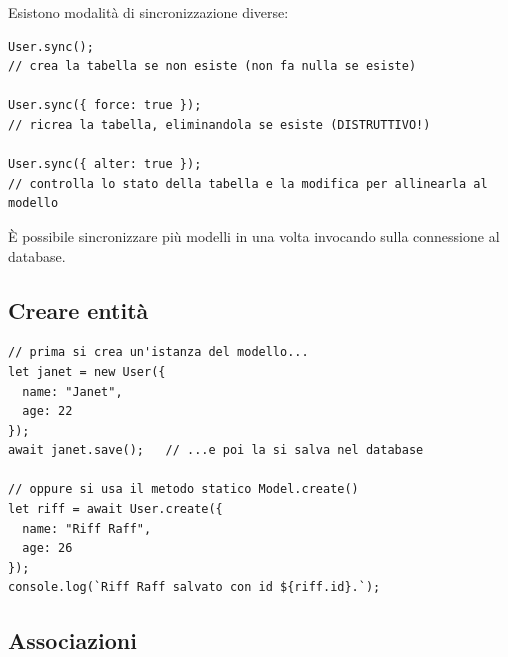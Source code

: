 Esistono modalità di sincronizzazione diverse:

\begin{lstlisting}[style=js]
User.sync();
// crea la tabella se non esiste (non fa nulla se esiste)

User.sync({ force: true });
// ricrea la tabella, eliminandola se esiste (DISTRUTTIVO!)

User.sync({ alter: true });
// controlla lo stato della tabella e la modifica per allinearla al modello
\end{lstlisting}

È possibile sincronizzare più modelli in una volta invocando  sulla
connessione al database.


\subsection{Creare entità}

\begin{affianco}[0.55][c]
\begin{lstlisting}[style=js, name=create.js]
// prima si crea un'istanza del modello...
let janet = new User({
  name: "Janet",
  age: 22
});
await janet.save();   // ...e poi la si salva nel database

// oppure si usa il metodo statico Model.create()
let riff = await User.create({
  name: "Riff Raff",
  age: 26
});
console.log(`Riff Raff salvato con id ${riff.id}.`);
\end{lstlisting}
\risultato
\begin{immagine}
\end{immagine}
\end{affianco}

\subsection{Associazioni}

